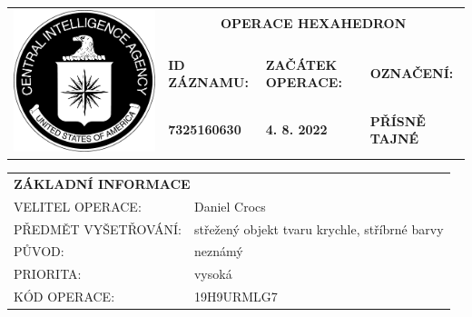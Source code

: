 \documentclass[a4paper, 11pt]{article}
\newlength{\fontheight}
\def\bottomrulewidth{0.3mm}		%
\def\tabtitleextraheight{5pt}	%
\def\tablestretch{1.4}			%
\newcommand{\blackcell}{\cellcolor{black} \color{white} \ttfamily \bfseries}
\newcommand{\ti}[2]{\ttfamily \MakeUppercase{#1}: & \ttfamily #2 \\ \midrule}
\newcommand{\lti}[2]{\ttfamily \MakeUppercase{#1}: & \ttfamily #2 \\ \bottomrule[\bottomrulewidth]}
\newcommand{\tabtitle}[2]{\multicolumn{#1}{l}{\blackcell \MakeUppercase{#2}\rule{0pt}{\dimexpr \fontheight + 1pt + \tabtitleextraheight \relax} } \\ [\tabtitleextraheight]}
\begin{document}
	
	\noindent
	\begin{table}[H]
		\renewcommand\tabularxcolumn[1]{m{#1}}
		\def\arraystretch{1.5}
		\begin{tabularx}{\textwidth}{l X X X}
			\multirow{4}{*}{ \includegraphics[scale=0.22]{sources/CIA_logo.pdf} } & \multicolumn{3}{c}{\bfseries \ttfamily \Huge OPERACE HEXAHEDRON} \\
			&&&\\
			& \blackcell ID ZÁZNAMU: & \blackcell ZAČÁTEK OPERACE: & \blackcell OZNAČENÍ: \\
			& \blackcell 7325160630 & \blackcell 4. 8. 2022 & \blackcell PŘÍSNĚ TAJNÉ \\
			
		\end{tabularx}
	\end{table}
	\vspace*{-0.5cm}
	\noindent
	\begin{minipage}[t]{0.62\textwidth}
		\begin{table}[H]
			\renewcommand\tabularxcolumn[1]{m{#1}}
			\def\arraystretch{\tablestretch}
			\begin{tabularx}{\textwidth}{l X}
				\tabtitle{2}{základní informace}
				\ti{velitel operace}{Daniel Crocs}
				\ti{předmět vyšetřování}{střežený objekt tvaru krychle, stříbrné barvy}
				\ti{původ}{neznámý}
				\ti{priorita}{vysoká}
				\lti{kód operace}{19H9URMLG7}
			\end{tabularx}
		\end{table}
	\end{minipage}
\end{document}
